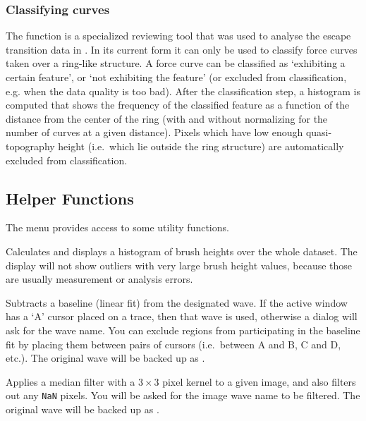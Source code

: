\documentclass[12pt,a4paper]{article}
\begin{document}
\subsubsection{Classifying curves}
The  function is a specialized reviewing tool that was used to analyse the escape transition data in \cite[p.~73]{hyotyla2016}.
In its current form it can only be used to classify force curves taken over a ring-like structure. A force curve can be classified as  \enquote*{exhibiting a certain feature}, or \enquote*{not exhibiting the feature} (or excluded from classification, e.g. when the data quality is too bad).
After the classification step, a histogram is computed that shows the frequency of the classified feature as a function of the distance from the center of the ring (with and without normalizing for the number of curves at a given distance).
Pixels which have low enough quasi-topography height (i.e.\ which lie outside the ring structure) are automatically excluded from classification.

\subsection{Helper Functions}
The  menu provides access to some utility functions.

\begin{description}[style=nextline]

\item[Brush Histogram]
Calculates and displays a histogram of brush heights over the whole dataset.
The display will not show outliers with very large brush height values, because those are usually measurement or analysis errors.

\item[Subtract Baseline]
Subtracts a baseline (linear fit) from the designated wave. If the active window has a \enquote*{A} cursor placed on a trace, then that wave is used,
otherwise a dialog will ask for the wave name. You can exclude regions from participating in the baseline fit by placing them between pairs of cursors
(i.e.\ between A and B, C and D, etc.). The original wave will be backed up as .

\item[Median Filter Image]
Applies a median filter with a $3 \times 3$ pixel kernel to a given image, and also filters out any \texttt{NaN} pixels. You will be asked for the image wave name to be filtered. The original wave will be backed up as .

\end{description}
\end{document}
